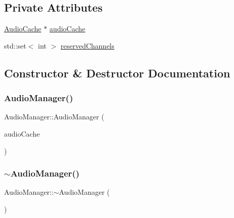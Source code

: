 \subsection*{Private Attributes}
\begin{DoxyCompactItemize}
\item 
\mbox{\hyperlink{classsage_1_1AudioCache}{Audio\+Cache}} $\ast$ \mbox{\hyperlink{classsage_1_1AudioManager_a67e231b6321bfb3d884a311522783a9c}{audio\+Cache}}
\item 
std\+::set$<$ int $>$ \mbox{\hyperlink{classsage_1_1AudioManager_a33e6f086e5dd82256d9b38edf6a56521}{reserved\+Channels}}
\end{DoxyCompactItemize}


\subsection{Constructor \& Destructor Documentation}
\mbox{\label{classsage_1_1AudioManager_a95f2ed16e4c7fdb2396624d45b398b00}} 
\subsubsection{\texorpdfstring{AudioManager()}{AudioManager()}}
{\footnotesize\ttfamily Audio\+Manager\+::\+Audio\+Manager (\begin{DoxyParamCaption}\item[{\mbox{\hyperlink{classsage_1_1AudioCache}{Audio\+Cache}} $\ast$}]{audio\+Cache }\end{DoxyParamCaption})}

\mbox{\label{classsage_1_1AudioManager_ad94dc46723c6d7cf8c81fc3772a842aa}} 
\subsubsection{\texorpdfstring{$\sim$AudioManager()}{~AudioManager()}}
{\footnotesize\ttfamily Audio\+Manager\+::$\sim$\+Audio\+Manager (\begin{DoxyParamCaption}{ }\end{DoxyParamCaption})}



